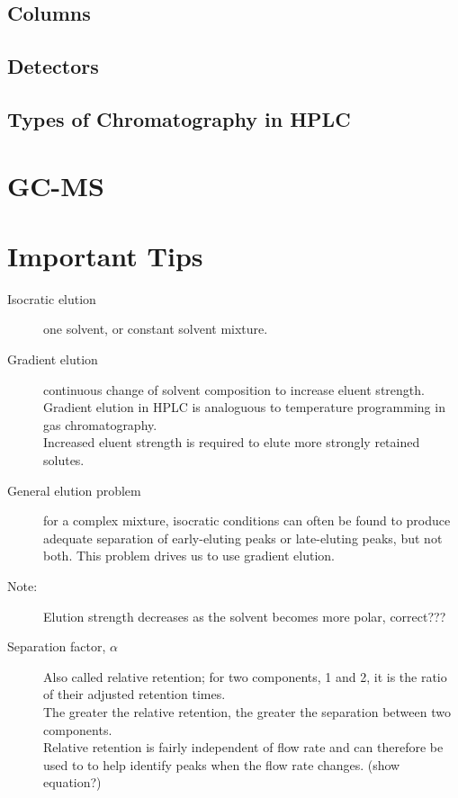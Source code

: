 \documentclass[a4paper, 12pt]{article}
\begin{document}
\subsection{Columns}


\subsection{Detectors}


\subsection{Types of Chromatography in HPLC}


\section{GC-MS}


\section{Important Tips}

\begin{description}
	\item[Isocratic elution] one solvent, or constant solvent mixture.
	\item[Gradient elution] continuous change of solvent composition to increase eluent strength. \\ Gradient elution in HPLC is analoguous to temperature programming in gas chromatography. \\ Increased eluent strength is required to elute more strongly retained solutes.
	\item[General elution problem] for a complex mixture, isocratic conditions can often be found to produce adequate separation of early-eluting peaks or late-eluting peaks, but not both. This problem drives us to use gradient elution.
	\item[Note:] Elution strength decreases as the solvent becomes more polar, correct???
	\item[Separation factor, $\alpha$] Also called relative retention; for two components, 1 and 2, it is the ratio of their adjusted retention times. \\ The greater the relative retention, the greater the separation between two components. \\ Relative retention is fairly independent of flow rate and can therefore be used to to help identify peaks when the flow rate changes. (show equation?)
\end{description}
\end{document}
